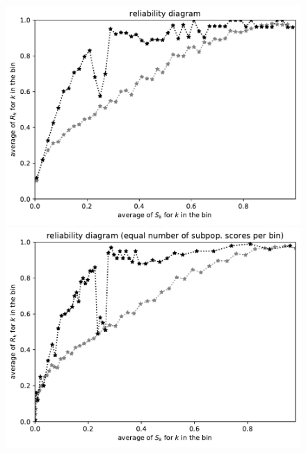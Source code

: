 \documentclass{article}
\begin{document}
\begin{figure}
\begin{centering}
\parbox{\imsize}{\includegraphics[width=\imsize]
                {./codes/unweighted/50000_5000_50_0/equiscore.pdf}}
\quad\quad
\parbox{\imsize}{\includegraphics[width=\imsize]
                {./codes/unweighted/50000_5000_50_0/equisamps.pdf}}


\end{centering}
\end{figure}
\end{document}
